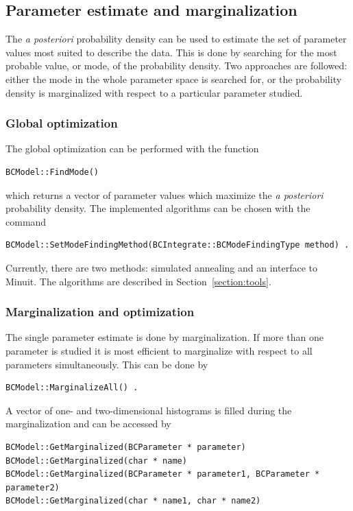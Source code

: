 \documentclass[11pt, a4paper]{article}
\begin{document}

\subsection{Parameter estimate and marginalization} 

The {\it a posteriori} probability density can be used to estimate the set of
parameter values most suited to describe the data. This is done by
searching for the most probable value, or mode, of the probability density. 
Two approaches are followed: either the mode in the
whole parameter space is searched for, or the probability density is
marginalized with respect to a particular parameter studied. 

\subsubsection{Global optimization} 

The global optimization can be performed with the function 
%
\begin{verbatim} 
BCModel::FindMode()
\end{verbatim} 

\noindent 
which returns a vector of parameter values which maximize the {\it a
posteriori} probability density. The implemented algorithms can be chosen
with the command
%
\begin{verbatim}
BCModel::SetModeFindingMethod(BCIntegrate::BCModeFindingType method) .
\end{verbatim}
%
Currently, there are two methods: simulated annealing and an interface
to Minuit. The algorithms are described in Section~\ref{section:tools}. \\

\subsubsection{Marginalization and optimization} 

\noindent 
The single parameter estimate is done by marginalization. If more than
one parameter is studied it is most efficient to marginalize with
respect to all parameters simultaneously. This can be done by
%
\begin{verbatim}
BCModel::MarginalizeAll() . 
\end{verbatim} 

\noindent 
A vector of one- and two-dimensional histograms is filled during the
marginalization and can be accessed by
%
\begin{verbatim}
BCModel::GetMarginalized(BCParameter * parameter) 
BCModel::GetMarginalized(char * name) 
BCModel::GetMarginalized(BCParameter * parameter1, BCParameter * parameter2) 
BCModel::GetMarginalized(char * name1, char * name2) 
\end{verbatim}
\end{document}
